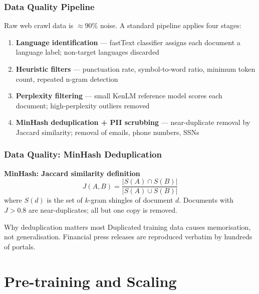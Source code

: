 \documentclass[9pt,t]{beamer}
\begin{document}
\begin{frame}
\frametitle{Data Quality Pipeline}

Raw web crawl data is $\approx 90\%$ noise. A standard pipeline applies four stages:

\medskip
\begin{enumerate}
  \item \textbf{Language identification} --- fastText classifier assigns each document
        a language label; non-target languages discarded
  \item \textbf{Heuristic filters} --- punctuation rate, symbol-to-word ratio,
        minimum token count, repeated n-gram detection
  \item \textbf{Perplexity filtering} --- small KenLM reference model scores each
        document; high-perplexity outliers removed
  \item \textbf{MinHash deduplication + PII scrubbing} --- near-duplicate removal
        by Jaccard similarity; removal of emails, phone numbers, SSNs
\end{enumerate}
\end{frame}

\begin{frame}
\frametitle{Data Quality: MinHash Deduplication}

\textbf{MinHash: Jaccard similarity definition}
\[
  J(A, B) = \frac{|S(A) \cap S(B)|}{|S(A) \cup S(B)|}
\]
where $S(d)$ is the set of $k$-gram shingles of document $d$.
Documents with $J > 0.8$ are near-duplicates; all but one copy is removed.

\medskip
\begin{alertblock}{Why deduplication matters most}
  Duplicated training data causes memorisation, not generalisation.
  Financial press releases are reproduced verbatim by hundreds of portals.
\end{alertblock}
\end{frame}

\section{Pre-training and Scaling}
\end{document}
